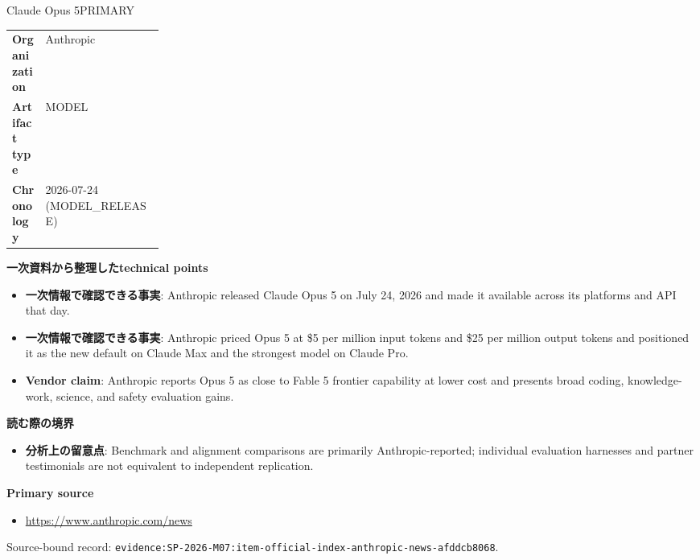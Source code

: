 \begin{technicalnote}{Claude Opus 5}{PRIMARY}
\begin{tabularx}{\linewidth}{@{}>{\bfseries}p{0.22\linewidth}X@{}}
Organization & Anthropic \\
Artifact type & MODEL \\
Chronology & 2026-07-24 (MODEL\_RELEASE) \\
\end{tabularx}
\smallskip
{\bfseries 一次資料から整理したtechnical points}
\begin{itemize}[leftmargin=1.5em,itemsep=0.35em]
\item \textbf{一次情報で確認できる事実}: Anthropic released Claude Opus 5 on July 24, 2026 and made it available across its platforms and API that day.
\item \textbf{一次情報で確認できる事実}: Anthropic priced Opus 5 at \$5 per million input tokens and \$25 per million output tokens and positioned it as the new default on Claude Max and the strongest model on Claude Pro.
\item \textbf{Vendor claim}: Anthropic reports Opus 5 as close to Fable 5 frontier capability at lower cost and presents broad coding, knowledge-work, science, and safety evaluation gains.
\end{itemize}
{\bfseries 読む際の境界}
\begin{itemize}[leftmargin=1.5em,itemsep=0.35em]
\item \textbf{分析上の留意点}: Benchmark and alignment comparisons are primarily Anthropic-reported; individual evaluation harnesses and partner testimonials are not equivalent to independent replication.
\end{itemize}
{\bfseries Primary source}
\begingroup\sloppy
\begin{itemize}[leftmargin=1.5em,itemsep=0.25em]
\item {\scriptsize\url{https://www.anthropic.com/news}}
\end{itemize}
\endgroup
{\scriptsize\color{SurveyMuted}Source-bound record: \texttt{evidence:SP-2026-M07:item-official-index-anthropic-news-afddcb8068}.}
\end{technicalnote}
\medskip


